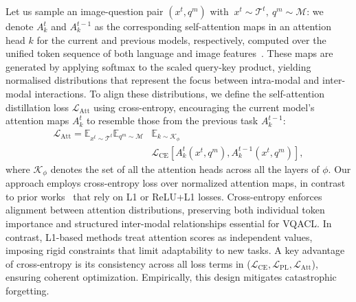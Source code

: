 Let us sample an image-question pair $(x^t, q^m)$ with \(~{x^t \sim \mathcal{T}^t},~{q^m \sim \mathcal{M}}\): we denote %
\( A_k^t \) and \( A_k^{t-1} \) as the corresponding self-attention maps in an attention head $k$ for the current and previous models, respectively, computed over the unified token sequence of both language and image features~\cite{zhang2023vqacl, nikandrou2022task}. These maps are generated by applying softmax to the scaled query-key product, yielding normalised distributions that represent the focus between intra-modal and inter-modal interactions. To align these distributions, we define the self-attention distillation loss \( \mathcal{L}_{\text{Att}} \) using cross-entropy, encouraging the current model’s attention maps \( A_k^{t} \) to resemble those from the previous task \( A_k^{t-1} \):
\begin{equation}
\begin{split}
  \mathcal{L}_{\text{Att}} = \mathbb{E}_{x^t\sim \mathcal{T}^t}\mathbb{E}_{q^m\sim \mathcal{M}}&\mathbb{E}_{k\sim \mathcal{K}_\phi}\\
  &\mathcal{L}_{\text{CE}}\left[A_{k}^{t}(x^t,q^m),A_{k}^{t-1}(x^t,q^m)\right],
\end{split}
\end{equation}
where $\mathcal{K}_\phi$ denotes the set of all the attention heads across all the layers of $\phi$. Our approach employs cross-entropy loss over normalized attention maps, in contrast to prior works~\citep{dhar2019learning, pelosin2022towards} that rely on L1 or ReLU+L1 losses. Cross-entropy enforces alignment between attention distributions, preserving both individual token importance and structured inter-modal relationships essential for VQACL. In contrast, L1-based methods treat attention scores as independent values, imposing rigid constraints that limit adaptability to new tasks. A key advantage of cross-entropy is its consistency across all loss terms in \qstmethodshort{} (\(\mathcal{L}_{\text{CE}}, \mathcal{L}_{\text{PL}}, \mathcal{L}_{\text{Att}}\)), ensuring coherent optimization. Empirically, this design mitigates catastrophic forgetting.

